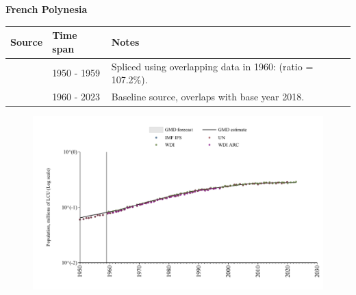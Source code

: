 \documentclass[12pt,a4paper,landscape]{article}
\begin{document}
\begin{adjustbox}{max totalsize={\paperwidth}{\paperheight},center}
\begin{minipage}[t][\textheight][t]{\textwidth}
\vspace*{0.5cm}
{}
\begin{center}
{\Large\bfseries French Polynesia}
\end{center}
\vspace{0.5cm}
\begin{table}[H]
\centering
\small
\begin{tabular}{|l|l|l|}
\hline
\textbf{Source} & \textbf{Time span} & \textbf{Notes} \\
\hline
\rowcolor{white}\cite{IMF_IFS}& 1950 - 1959 &Spliced using overlapping data in 1960: (ratio = 107.2\%).\\
\rowcolor{lightgray}\cite{WDI}& 1960 - 2023 &Baseline source, overlaps with base year 2018.\\
\hline
\end{tabular}
\end{table}
\begin{figure}[H]
\centering
\includegraphics[width=\textwidth,height=0.6\textheight,keepaspectratio]{graphs/PYF_pop.pdf}
\end{figure}
\end{minipage}
\end{adjustbox}
\end{document}
